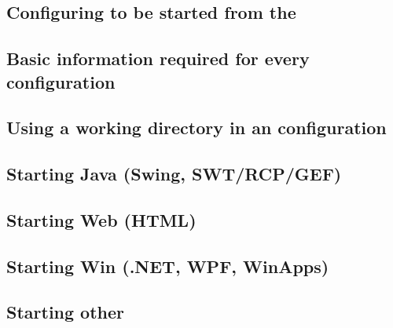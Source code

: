 \subsection{Configuring \gdauts{} to be started from the \ite{}}
\label{configuringaut}


\subsection{Basic information required for every \gdaut{} configuration}
\label{TasksBasicConfigurationInfo}


\subsection{Using a working directory in an \gdaut{} configuration}
\label{TasksWorkingDir}


\subsection{Starting Java \gdauts{} (Swing, SWT/RCP/GEF)}
\label{TasksStartJavaAUT}


\subsection{Starting Web \gdauts{} (HTML)}
\label{TasksStartWebAUT}


\subsection{Starting Win \gdauts{} (.NET, WPF, WinApps)}
\label{TasksStartWinAUT}
 

\subsection{Starting other \gdauts{}}




